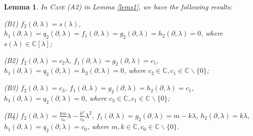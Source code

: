 \documentclass[11pt,letterpaper,reqno]{amsart}
\newtheorem{lemma}[theorem]{Lemma}
\theoremstyle{definition}
\numberwithin{equation}{section}
\begin{document}
\begin{lemma}\label{lems2}
In C\textsc{ase} (A2) in Lemma \ref{lems1}, we have the following results:





(B1) $f_2(\partial, \lambda)=s(\lambda)$, $h_1(\partial, \lambda)=q_2(\partial, \lambda)=f_1(\partial, \lambda)=g_2(\partial, \lambda)=h_2(\partial, \lambda)=0$, where $s(\lambda)\in\mathbb{C}[\lambda]$;

(B2) $f_2(\partial, \lambda)=c_2\lambda$, $f_1(\partial, \lambda)=g_2(\partial, \lambda)=c_1$, $h_1(\partial, \lambda)=q_2(\partial, \lambda)=h_2(\partial, \lambda)=0$, where $c_2\in\mathbb{C}, c_1\in \mathbb{C}\backslash\{0\}$;

(B3) $f_2(\partial, \lambda)=c_3$, $f_1(\partial, \lambda)=g_2(\partial, \lambda)=h_2(\partial, \lambda)=c_1$, $h_1(\partial, \lambda)=q_2(\partial, \lambda)=0$, where $c_3\in\mathbb{C}, c_1\in \mathbb{C}\backslash\{0\}$;

(B4) $f_2(\partial, \lambda)=\frac{km}{c_0}\lambda-\frac{k^2}{c_0}\lambda^2$, $f_1(\partial, \lambda)=g_2(\partial, \lambda)=m-k\lambda$, $h_2(\partial, \lambda)=k\lambda$, $h_1(\partial, \lambda)=q_2(\partial, \lambda)=c_0$, where $m,k\in\mathbb{C}, c_0\in \mathbb{C}\backslash\{0\}$.

\end{lemma}
\end{document}
